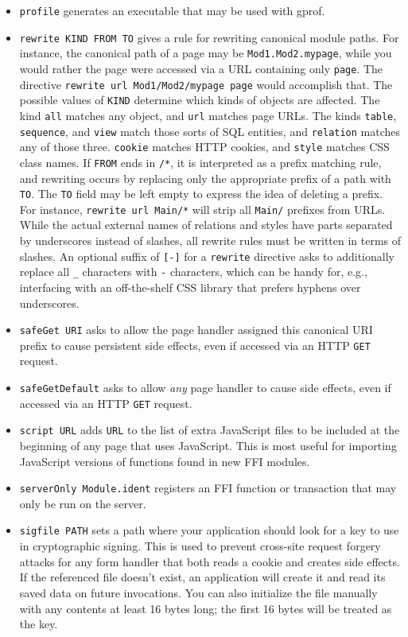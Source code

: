 \documentclass{article}
\newcommand{\cd}[1]{\texttt{#1}}
\begin{document}
\begin{itemize}
\item \texttt{profile} generates an executable that may be used with gprof.
\item \texttt{rewrite KIND FROM TO} gives a rule for rewriting canonical module paths.  For instance, the canonical path of a page may be \texttt{Mod1.Mod2.mypage}, while you would rather the page were accessed via a URL containing only \texttt{page}.  The directive \texttt{rewrite url Mod1/Mod2/mypage page} would accomplish that.  The possible values of \texttt{KIND} determine which kinds of objects are affected.  The kind \texttt{all} matches any object, and \texttt{url} matches page URLs.  The kinds \texttt{table}, \texttt{sequence}, and \texttt{view} match those sorts of SQL entities, and \texttt{relation} matches any of those three.  \texttt{cookie} matches HTTP cookies, and \texttt{style} matches CSS class names.  If \texttt{FROM} ends in \texttt{/*}, it is interpreted as a prefix matching rule, and rewriting occurs by replacing only the appropriate prefix of a path with \texttt{TO}.  The \texttt{TO} field may be left empty to express the idea of deleting a prefix.  For instance, \texttt{rewrite url Main/*} will strip all \texttt{Main/} prefixes from URLs.  While the actual external names of relations and styles have parts separated by underscores instead of slashes, all rewrite rules must be written in terms of slashes.  An optional suffix of \cd{[-]} for a \cd{rewrite} directive asks to additionally replace all \cd{\_} characters with \cd{-} characters, which can be handy for, e.g., interfacing with an off-the-shelf CSS library that prefers hyphens over underscores.
\item \texttt{safeGet URI} asks to allow the page handler assigned this canonical URI prefix to cause persistent side effects, even if accessed via an HTTP \cd{GET} request.
\item \texttt{safeGetDefault} asks to allow \emph{any} page handler to cause side effects, even if accessed via an HTTP \cd{GET} request.
\item \texttt{script URL} adds \texttt{URL} to the list of extra JavaScript files to be included at the beginning of any page that uses JavaScript.  This is most useful for importing JavaScript versions of functions found in new FFI modules.
\item \texttt{serverOnly Module.ident} registers an FFI function or transaction that may only be run on the server.
\item \texttt{sigfile PATH} sets a path where your application should look for a key to use in cryptographic signing.  This is used to prevent cross-site request forgery attacks for any form handler that both reads a cookie and creates side effects.  If the referenced file doesn't exist, an application will create it and read its saved data on future invocations.  You can also initialize the file manually with any contents at least 16 bytes long; the first 16 bytes will be treated as the key.

\end{itemize}
\end{document}
